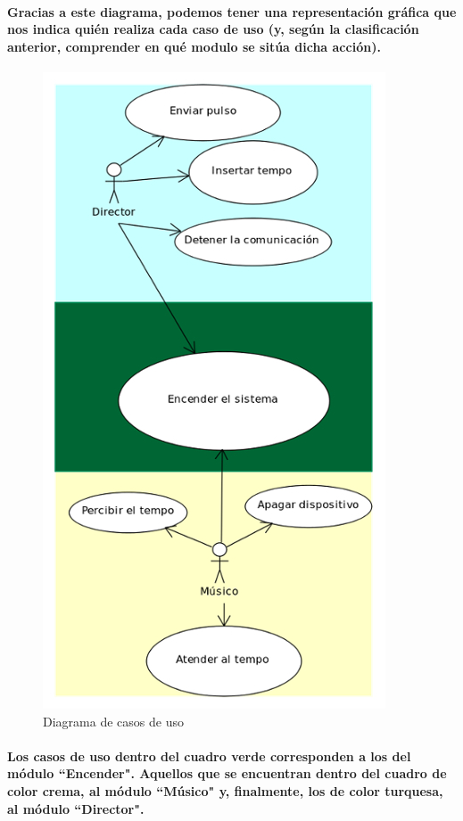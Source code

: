 \paragraph{
Gracias a este diagrama, podemos tener una representación gráfica que nos
indica quién realiza cada caso de uso (y, según la clasificación anterior,
comprender en qué modulo se sitúa dicha acción).
}
\begin{figure}[!htb]
\centering
\includegraphics[]{./imagenes/diagramacasosdeuso}
\caption{Diagrama de casos de uso} \label{fig:diagramacasosdeuso}
\end{figure}

\paragraph{
Los casos de uso dentro del cuadro verde corresponden a los del módulo ``Encender".
Aquellos que se encuentran dentro del cuadro de color crema, al módulo ``Músico" y, finalmente,
los de color turquesa, al módulo ``Director".
}
